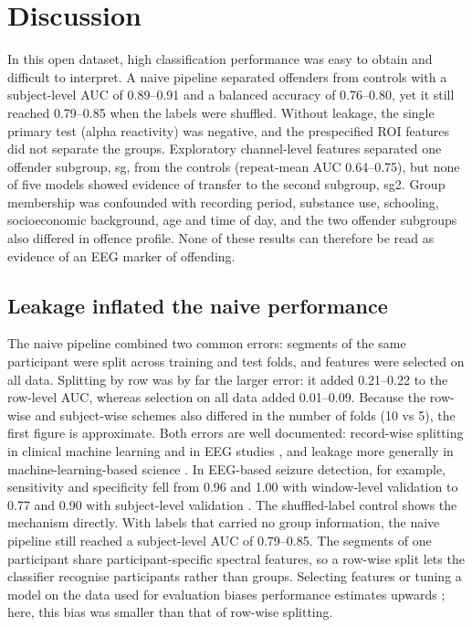 
\section{Discussion}
\label{sec:discussion}

In this open dataset, high classification performance was easy to obtain and difficult to interpret. A naive pipeline separated offenders from controls with a subject-level AUC of 0.89--0.91 and a balanced accuracy of 0.76--0.80, yet it still reached 0.79--0.85 when the labels were shuffled. Without leakage, the single primary test (alpha reactivity) was negative, and the prespecified ROI features did not separate the groups. Exploratory channel-level features separated one offender subgroup, sg, from the controls (repeat-mean AUC 0.64--0.75), but none of five models showed evidence of transfer to the second subgroup, sg2. Group membership was confounded with recording period, substance use, schooling, socioeconomic background, age and time of day, and the two offender subgroups also differed in offence profile. None of these results can therefore be read as evidence of an EEG marker of offending.

\subsection{Leakage inflated the naive performance}
\label{sec:disc-leakage}

The naive pipeline combined two common errors: segments of the same participant were split across training and test folds, and features were selected on all data. Splitting by row was by far the larger error: it added 0.21--0.22 to the row-level AUC, whereas selection on all data added 0.01--0.09. Because the row-wise and subject-wise schemes also differed in the number of folds (10 vs 5), the first figure is approximate. Both errors are well documented: record-wise splitting in clinical machine learning \cite{Saeb2017} and in EEG studies \cite{Brookshire2024}, and leakage more generally in machine-learning-based science \cite{Kapoor2023}. In EEG-based seizure detection, for example, sensitivity and specificity fell from 0.96 and 1.00 with window-level validation to 0.77 and 0.90 with subject-level validation \cite{Gil2026}. The shuffled-label control shows the mechanism directly. With labels that carried no group information, the naive pipeline still reached a subject-level AUC of 0.79--0.85. The segments of one participant share participant-specific spectral features, so a row-wise split lets the classifier recognise participants rather than groups. Selecting features or tuning a model on the data used for evaluation biases performance estimates upwards \cite{Varma2006,Cawley2010}; here, this bias was smaller than that of row-wise splitting.

